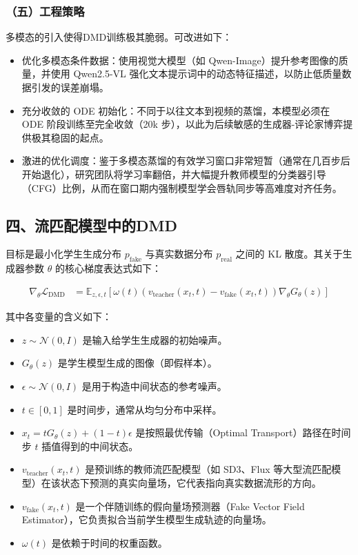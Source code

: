 \hypertarget{ux4e94ux5de5ux7a0bux7b56ux7565}{%
\subsubsection{（五）工程策略}\label{ux4e94ux5de5ux7a0bux7b56ux7565}}

多模态的引入使得DMD训练极其脆弱。可改进如下：

\begin{itemize}
\tightlist
\item
  优化多模态条件数据：使用视觉大模型（如 Qwen-Image）提升参考图像的质量，并使用 Qwen2.5-VL 强化文本提示词中的动态特征描述，以防止低质量数据引发的误差崩塌。
\item
  充分收敛的 ODE 初始化：不同于以往文本到视频的蒸馏，本模型必须在 ODE 阶段训练至完全收敛（20k 步），以此为后续敏感的生成器-评论家博弈提供极其稳固的起点。
\item
  激进的优化调度：鉴于多模态蒸馏的有效学习窗口非常短暂（通常在几百步后开始退化），研究团队将学习率翻倍，并大幅提升教师模型的分类器引导（CFG）比例，从而在窗口期内强制模型学会唇轨同步等高难度对齐任务。
\end{itemize}

\hypertarget{ux56dbux6d41ux5339ux914dux6a21ux578bux4e2dux7684dmd}{%
\subsection{四、流匹配模型中的DMD}\label{ux56dbux6d41ux5339ux914dux6a21ux578bux4e2dux7684dmd}}

目标是最小化学生生成分布 \(p_{\mathrm{fake}}\) 与真实数据分布 \(p_{\mathrm{real}}\) 之间的 KL 散度。其关于生成器参数 \(\theta\) 的核心梯度表达式如下：

\[
\begin{aligned}
\nabla_\theta\mathcal{L}_{\mathrm{DMD}}
&=
\mathbb{E}_{z,\epsilon,t}\left[
\omega(t)
\left(v_{\mathrm{teacher}}(x_t,t)-v_{\mathrm{fake}}(x_t,t)\right)
\nabla_\theta G_\theta(z)
\right]
\end{aligned}
\]

其中各变量的含义如下：

\begin{itemize}
\tightlist
\item
  \(z\sim\mathcal{N}(0,I)\) 是输入给学生生成器的初始噪声。
\item
  \(G_\theta(z)\) 是学生模型生成的图像（即假样本）。
\item
  \(\epsilon\sim\mathcal{N}(0,I)\) 是用于构造中间状态的参考噪声。
\item
  \(t\in[0,1]\) 是时间步，通常从均匀分布中采样。
\item
  \(x_t=tG_\theta(z)+(1-t)\epsilon\) 是按照最优传输（Optimal Transport）路径在时间步 \(t\) 插值得到的中间状态。
\item
  \(v_{\mathrm{teacher}}(x_t,t)\) 是预训练的教师流匹配模型（如 SD3、Flux 等大型流匹配模型）在该状态下预测的真实向量场，它代表指向真实数据流形的方向。
\item
  \(v_{\mathrm{fake}}(x_t,t)\) 是一个伴随训练的假向量场预测器（Fake Vector Field Estimator），它负责拟合当前学生模型生成轨迹的向量场。
\item
  \(\omega(t)\) 是依赖于时间的权重函数。
\end{itemize}

